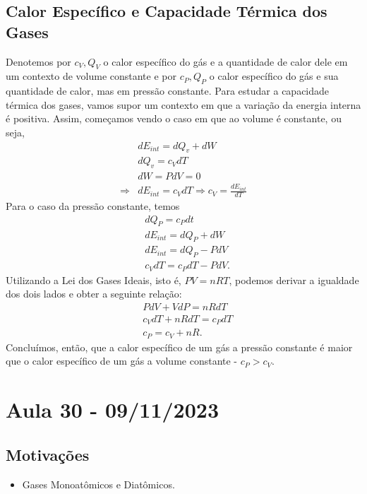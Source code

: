 \documentclass{article}
\begin{document}
\subsection{Calor Específico e Capacidade Térmica dos Gases} 
Denotemos por \(c_{V}, Q_{V}\) o calor específico do gás e a quantidade de calor dele em um contexto de volume constante e por \(c_{P}, Q_{P}\) o
calor específico do gás e sua quantidade de calor, mas em pressão constante. Para estudar a capacidade térmica dos gases, vamos
supor um contexto em que a variação da energia interna é positiva. Assim, começamos vendo o caso em que ao volume é constante, ou seja, 
\begin{align*}
  &dE_{int} = dQ_{v} + dW\\
  &dQ_{v} = c_{V}dT\\
  &dW = PdV = 0\\
  \Rightarrow &dE_{int} = c_{V}dT \Rightarrow c_{V} = \frac{dE_{int}}{dT}
\end{align*}
Para o caso da pressão constante, temos
\begin{align*}
  &dQ_{P} = c_{P}dt\\
  &dE_{int} = dQ_{P} + dW\\
  &dE_{int} = dQ_{P} - PdV\\
  &c_{V}dT = c_{P}dT - PdV.
\end{align*}
Utilizando a Lei dos Gases Ideais, isto é, \(PV = nRT\), podemos derivar a igualdade dos dois lados e obter a seguinte relação:
\begin{align*}
  &PdV + VdP = nRdT\\
  &c_{V}dT + nRdT = c_{P}dT\\
  &c_{P} = c_{V} + nR.
\end{align*}
Concluímos, então, que a calor específico de um gás a pressão constante é maior que o calor específico de um gás a
volume constante - \(c_{P} > c_{V}\).
\newpage

\section{Aula 30 - 09/11/2023}
\subsection{Motivações}
\begin{itemize}
  \item Gases Monoatômicos e Diatômicos.
\end{itemize}
\end{document}
